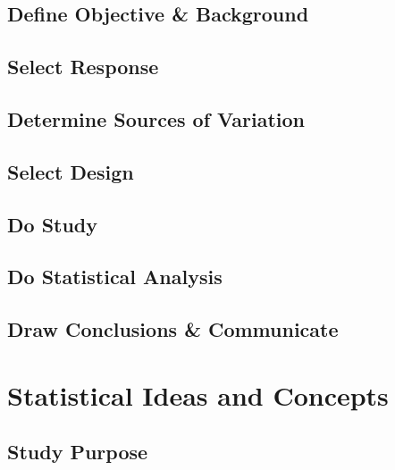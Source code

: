 \documentclass[
]{book}
\theoremstyle{definition}
\theoremstyle{definition}
\theoremstyle{definition}
\theoremstyle{remark}
\begin{document}
\hypertarget{define-objective-background-1}{%
\subsection{Define Objective \& Background}\label{define-objective-background-1}}

\hypertarget{select-response-1}{%
\subsection{Select Response}\label{select-response-1}}

\hypertarget{determine-sources-of-variation-1}{%
\subsection{Determine Sources of Variation}\label{determine-sources-of-variation-1}}

\hypertarget{select-design-1}{%
\subsection{Select Design}\label{select-design-1}}

\hypertarget{do-study-1}{%
\subsection{Do Study}\label{do-study-1}}

\hypertarget{do-statistical-analysis-1}{%
\subsection{Do Statistical Analysis}\label{do-statistical-analysis-1}}

\hypertarget{draw-conclusions-communicate-1}{%
\subsection{Draw Conclusions \& Communicate}\label{draw-conclusions-communicate-1}}

\hypertarget{statistical-ideas-and-concepts}{%
\section{Statistical Ideas and Concepts}\label{statistical-ideas-and-concepts}}

\hypertarget{study-purpose}{%
\subsection{Study Purpose}\label{study-purpose}}
\end{document}
